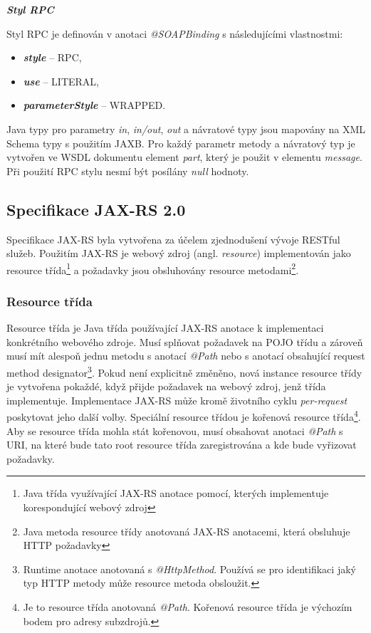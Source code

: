 \documentclass[11pt,twoside,a4paper]{book}
\begin{document}
\textbf{\textit{Styl RPC}}

Styl RPC je definován v anotaci {\em @SOAPBinding} s následujícími vlastnostmi:

\begin{itemize}
  \item \textbf{\textit{style}} – RPC,
  \item \textbf{\textit{use}} – LITERAL,
  \item \textbf{\textit{parameterStyle}} – WRAPPED.
\end{itemize}

Java typy pro parametry {\em in}, {\em in/out}, {\em out} a návratové
typy jsou mapovány na XML Schema typy s použitím JAXB. Pro každý parametr metody a návratový typ je vytvořen ve WSDL
dokumentu element {\em part}, který je použit v elementu {\em message}. Při
použití RPC stylu nesmí být posílány {\em null} hodnoty.

\subsection{Specifikace JAX-RS 2.0}
\label{subsec:specifikace-jax-rs}

Specifikace JAX-RS \cite{JAXRS20} byla vytvořena za účelem zjednodušení vývoje
RESTful služeb.
Použitím JAX-RS je webový zdroj (angl. {\em resource})  implementován jako
resource třída\footnote{Java třída využívající JAX-RS anotace pomocí,
kterých implementuje korespondující webový zdroj} a požadavky jsou obsluhovány resource
metodami\footnote{Java metoda resource třídy anotovaná JAX-RS
anotacemi, která obsluhuje HTTP požadavky}.

\subsubsection{Resource třída}
\label{subsec:resource-trida}

Resource třída je Java třída používající JAX-RS anotace k implementaci
konkrétního webového zdroje. Musí splňovat požadavek na POJO třídu a zároveň
musí mít alespoň jednu metodu s anotací {\em @Path} nebo s anotací obsahující
request method designator\footnote{Runtime anotace anotovaná s {\em
@HttpMethod}.
Používá se pro identifikaci jaký typ HTTP metody může resource metoda
obsloužit.}.
Pokud není explicitně změněno, nová instance resource třídy je vytvořena
pokaždé, když přijde požadavek na webový zdroj, jenž třída implementuje.
Implementace JAX-RS může kromě životního cyklu {\em per-request} poskytovat
jeho další volby. Speciální resource třídou je kořenová resource
třída\footnote{Je to resource třída anotovaná {\em @Path}. Kořenová resource
třída je výchozím bodem pro adresy subzdrojů.}.
Aby se resource třída mohla stát kořenovou, musí obsahovat anotaci {\em @Path} s
URI, na které bude tato root resource třída zaregistrována a kde bude vyřizovat požadavky. \cite{JAXRS20}
\end{document}

